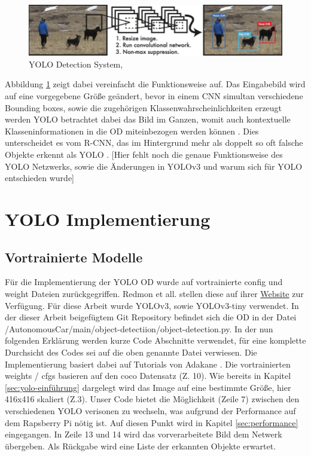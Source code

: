\begin{figure}[H]
    \centering
    \includegraphics[scale=0.5]{./img/yolo.png}
    \caption{YOLO Detection System, \cite[S.1]{Redmon.08.06.2015}}
    \label{fig:yolo}
\end{figure}

Abbildung \ref{fig:yolo} zeigt dabei vereinfacht die Funktionsweise auf. Das Eingabebild wird auf eine vorgegebene Größe geändert, bevor in einem \ac{CNN} simultan verschiedene Bounding boxes, sowie die zugehörigen Klassenwahrscheinlichkeiten erzeugt werden \cite[S.1]{Redmon.08.06.2015}
\ac{YOLO} betrachtet dabei das Bild im Ganzen, womit auch kontextuelle Klasseninformationen in die \ac{OD} miteinbezogen werden können \cite[S.1f.]{Redmon.08.06.2015}. Dies unterscheidet es vom \ac{R-CNN}, das im Hintergrund mehr als doppelt so oft falsche Objekte erkennt als \ac{YOLO} \cite[S.2]{Redmon.08.06.2015}.
[Hier fehlt noch die genaue Funktionsweise des YOLO Netzwerks, sowie die Änderungen in YOLOv3 und warum sich für YOLO entschieden wurde]


\section{YOLO Implementierung}\label{sec:yolo}

\subsection{Vortrainierte Modelle}

Für die Implementierung der \ac{YOLO} \ac{OD} wurde auf vortrainierte config und weight Dateien zurückgegriffen. Redmon et all. stellen diese auf ihrer \href{https://pjreddie.com/darknet/yolo/}{Website} \cite{RedmonJosephFahradiAli.2020} zur Verfügung.
Für diese Arbeit wurde YOLOv3, sowie YOLOv3-tiny verwendet.
In der dieser Arbeit beigefügtem Git Repository befindet sich die \ac{OD} in der Datei /AutonomousCar/main/object-detectiion/object-detection.py. In der nun folgenden Erklärung werden kurze Code Abschnitte verwendet, für eine komplette Durchsicht des Codes sei auf die oben genannte Datei verwiesen.
Die Implementierung basiert dabei auf Tutorials von Adakane \cite{DarshanAdakane.2019, DarshanAdakane.2019b}.
Die vortrainierten weights / cfgs basieren auf den coco Datensatz (Z. 10). Wie bereits in Kapitel \ref{sec:yolo-einführung} dargelegt wird das Image auf eine bestimmte Größe, hier 416x416 skaliert (Z.3). Unser Code bietet die Möglichkeit (Zeile 7) zwischen den verschiedenen YOLO verisonen zu wechseln, was aufgrund der Performance auf dem Rapsberry Pi nötig ist. Auf diesen Punkt wird in Kapitel \ref{sec:performance} eingegangen. In Zeile 13 und 14 wird das vorverarbeitete Bild dem Netwerk übergeben. Als Rückgabe wird eine Liste der erkannten Objekte erwartet.

